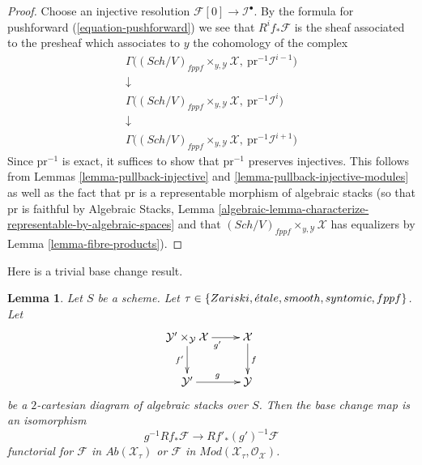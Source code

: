\documentclass{stacks-project}
\theoremstyle{plain}
\newtheorem{lemma}[subsection]{Lemma}
\theoremstyle{definition}
\theoremstyle{remark}
\numberwithin{equation}{subsection}
\def\Sch{\mathit{Sch}}
\def\etale{{\acute{e}tale}}
\begin{document}
\begin{proof}
Choose an injective resolution $\mathcal{F}[0] \to \mathcal{I}^\bullet$.
By the formula for pushforward (\ref{equation-pushforward}) we see that
$R^if_*\mathcal{F}$ is the sheaf associated to the presheaf which associates
to $y$ the cohomology of the complex
$$
\begin{matrix}
\Gamma\Big((\Sch/V)_{fppf} \times_{y, \mathcal{Y}} \mathcal{X},
\ \text{pr}^{-1}\mathcal{I}^{i - 1}\Big) \\
\downarrow \\
\Gamma\Big((\Sch/V)_{fppf} \times_{y, \mathcal{Y}} \mathcal{X},
\ \text{pr}^{-1}\mathcal{I}^i\Big) \\
\downarrow \\
\Gamma\Big((\Sch/V)_{fppf} \times_{y, \mathcal{Y}} \mathcal{X},
\ \text{pr}^{-1}\mathcal{I}^{i + 1}\Big)
\end{matrix}
$$
Since $\text{pr}^{-1}$ is exact, it suffices to show that
$\text{pr}^{-1}$ preserves injectives. This follows from
Lemmas \ref{lemma-pullback-injective} and
\ref{lemma-pullback-injective-modules}
as well as the fact that $\text{pr}$ is a representable morphism of
algebraic stacks (so that $\text{pr}$ is faithful by
Algebraic Stacks, Lemma
\ref{algebraic-lemma-characterize-representable-by-algebraic-spaces}
and that
$(\Sch/V)_{fppf} \times_{y, \mathcal{Y}} \mathcal{X}$
has equalizers by 
Lemma \ref{lemma-fibre-products}).
\end{proof}

\noindent
Here is a trivial base change result.

\begin{lemma}
\label{lemma-base-change-higher-direct-images}
Let $S$ be a scheme. Let
$\tau \in \{Zariski,\linebreak[0] \etale,\linebreak[0]
smooth,\linebreak[0] syntomic,\linebreak[0] fppf\}$. Let
$$
\xymatrix{
\mathcal{Y}' \times_\mathcal{Y} \mathcal{X} \ar[r]_{g'} \ar[d]_{f'} &
\mathcal{X} \ar[d]^f \\
\mathcal{Y}' \ar[r]^g & \mathcal{Y}
}
$$
be a $2$-cartesian diagram of algebraic stacks over $S$. Then the base change
map is an isomorphism
$$
g^{-1}Rf_*\mathcal{F} \longrightarrow Rf'_*(g')^{-1}\mathcal{F}
$$
functorial for $\mathcal{F}$ in $\textit{Ab}(\mathcal{X}_\tau)$
or $\mathcal{F}$ in $\textit{Mod}(\mathcal{X}_\tau, \mathcal{O}_\mathcal{X})$.
\end{lemma}
\end{document}
